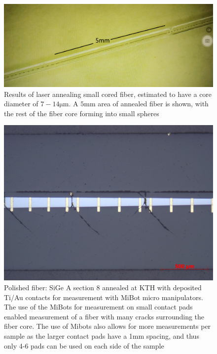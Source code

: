 \begin{figure}
    \centering
    \includegraphics[width=\textwidth]{fig/Results/wei_anneal.png}
    \caption{Results of laser annealing small cored fiber, estimated to have a core diameter of $7-14 \si{\micro\meter}$. A $5\si{\mm}$ area of annealed fiber is shown, with the rest of the fiber core forming into small spheres}
    \label{balls}
\end{figure}


\begin{figure}
    \centering
    \includegraphics[width=\textwidth]{fig/Results/kthdb30618-8.jpg}
    \caption{Polished fiber: SiGe A section 8 annealed at KTH with deposited Ti/Au contacts for measurement with MiBot micro manipulators. The use of the MiBots for measurement on small contact pads enabled measurement of a fiber with many cracks surrounding the fiber core. The use of Mibots also allows for more measurements per sample as the larger contact pads have a 1mm spacing, and thus only 4-6 pads can be used on each side of the sample}
    \label{fig:db30618KTH}
\end{figure}


